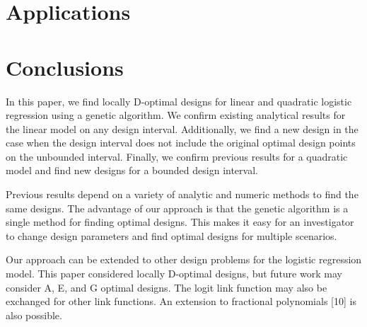 \documentclass[11pt,a4paper]{article}
\begin{document}
\section{Applications}
\section{Conclusions}
In this paper, we find locally D-optimal designs for linear and quadratic logistic regression using a genetic algorithm. We confirm existing analytical results for the linear model on any design interval. Additionally, we find a new design in the case when the design interval does not include the original optimal design points on the unbounded interval. Finally, we confirm previous results for a quadratic model and find new designs for a bounded design interval.

 Previous results depend on a variety of analytic and numeric methods to find the same designs. The advantage of our approach is that the genetic algorithm is a single method for finding optimal designs. This makes it easy for an investigator to change design parameters and find optimal designs for multiple scenarios.
 
Our approach can be extended to other design problems for the logistic regression model. This paper considered locally D-optimal designs, but future work may consider A, E, and G optimal designs. The logit link function may also be exchanged for other link functions. An extension to fractional polynomials [10] is also possible.
 
\newpage
\end{document}
